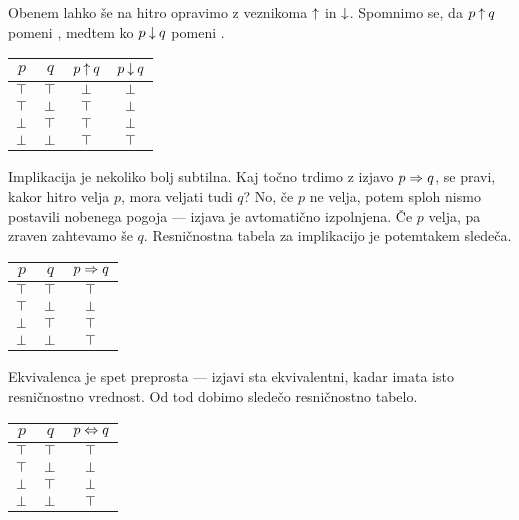                 Obenem lahko še na hitro opravimo z veznikoma $\mathbin{\uparrow}$ in $\mathbin{\downarrow}$. Spomnimo se, da $p \mathbin{\uparrow} q$ pomeni , medtem ko $p \mathbin{\downarrow} q$ pomeni .
                \begin{center}
                        \begin{tabular}{cc|cc}
                                $p$ & $q$ & $p \mathbin{\uparrow} q$ & $p \mathbin{\downarrow} q$ \\
                                \hline
                                $\top$ & $\top$ & $\bot$ & $\bot$ \\
                                $\top$ & $\bot$ & $\top$ & $\bot$ \\
                                $\bot$ & $\top$ & $\top$ & $\bot$ \\
                                $\bot$ & $\bot$ & $\top$ & $\top$
                        \end{tabular}
                \end{center}

                Implikacija je nekoliko bolj subtilna. Kaj točno trdimo z izjavo $p \Rightarrow q$, se pravi, kakor hitro velja $p$, mora veljati tudi $q$? No, če $p$ ne velja, potem sploh nismo postavili nobenega pogoja --- izjava je avtomatično izpolnjena. Če $p$ velja, pa zraven zahtevamo še $q$. Resničnostna tabela za implikacijo je potemtakem sledeča.
                \begin{center}
                        \begin{tabular}{cc|c}
                                $p$ & $q$ & $p \Rightarrow q$ \\
                                \hline
                                $\top$ & $\top$ & $\top$ \\
                                $\top$ & $\bot$ & $\bot$ \\
                                $\bot$ & $\top$ & $\top$ \\
                                $\bot$ & $\bot$ & $\top$
                        \end{tabular}
                \end{center}

                Ekvivalenca je spet preprosta --- izjavi sta ekvivalentni, kadar imata isto resničnostno vrednost. Od tod dobimo sledečo resničnostno tabelo.
                \begin{center}
                        \begin{tabular}{cc|c}
                                $p$ & $q$ & $p \Leftrightarrow q$ \\
                                \hline
                                $\top$ & $\top$ & $\top$ \\
                                $\top$ & $\bot$ & $\bot$ \\
                                $\bot$ & $\top$ & $\bot$ \\
                                $\bot$ & $\bot$ & $\top$
                        \end{tabular}
                \end{center}

